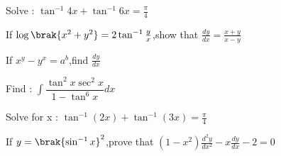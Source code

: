 
\item Solve : $\tan^{-1}4x+\tan^{-1}6x=\frac{\pi}{4}$
\hfill{}\item If $\log\brak{x^2+y^2}=2\tan^{-1}\frac{y}{x}$,show that $\frac{dy}{dx}=\frac{x+y}{x-y}$
\hfill{}\item If $x^y-y^x=a^b$,find $\frac{dy}{dx}$
\hfill{}\item Find : $\int\dfrac{\tan^2x\sec^2x}{1-\tan^6x} dx$
\hfill{}\item Solve for x :  $\tan^{-1}(2x)+\tan^{-1}(3x)=\frac{\pi}{4}$
\hfill{}\item If $y=\brak{\sin^{-1}x}^2$,prove that $(1-x^2)\frac{d^2y}{dx^2}-x\frac{dy}{dx}-2=0$
\hfill{}
